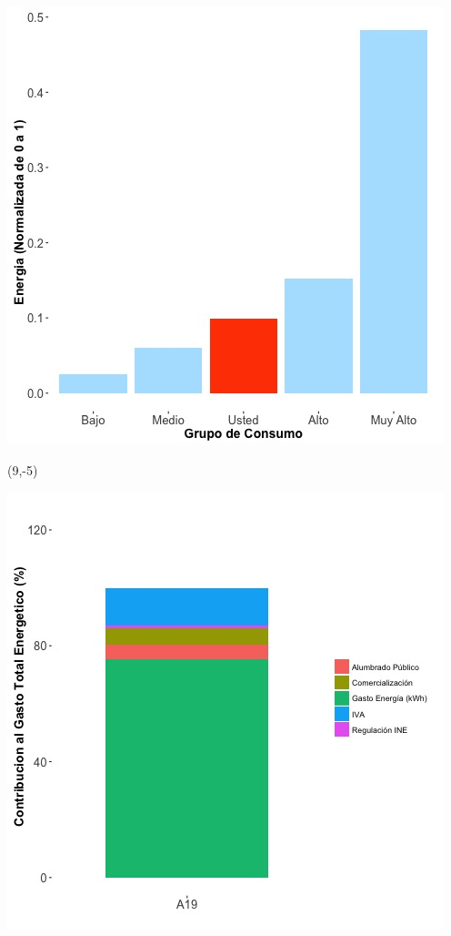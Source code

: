 \documentclass{article}\usepackage[]{graphicx}\usepackage[]{color}
\newenvironment{knitrout}{}{} %
\begin{document}
\begin{knitrout}
\color{fgcolor}
\includegraphics[scale=0.65]{figure/A19_neighbor_plot} 
\end{knitrout}

 \begin{textblock}{1}(9,-5)
\begin{minipage}{20em}
\begingroup

\endgroup
\end{minipage}
\end{textblock}

\begin{knitrout}
\color{fgcolor}
\includegraphics[scale=0.65]{figure/A19_costvars_plot.jpg} 
\end{knitrout}
\end{document}
